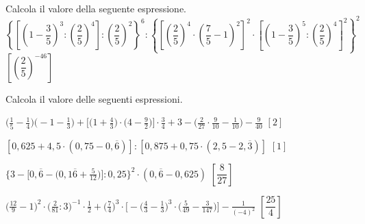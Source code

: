 
\begin{esercizio}[\Ast]
\label{ese:3.154}
Calcola il valore della seguente espressione.
\(
\left\{\left[\left(1-\dfrac{3}{5}\right)^3:\left(\dfrac{2}{5}\right)^{4}\right]:
 \left(\dfrac{2}{5}\right)^{2} \right\}^{6}
:\left\{\left[\left(\dfrac{2}{5}\right)^{4}\cdot\left(\dfrac{7}{5}-
1\right)^2\right]^{2}\cdot%
\left[\left(1-\dfrac{3}{5}\right)^{5}:\left(\dfrac{2}{5}\right)^{4}
\right]^{2}\right\}^{2}
\)
  \hfill \(\left[\left(\dfrac{2}{5} \right)^{-46} \right]\)
\end{esercizio}


\begin{esercizio}[\Ast]
\label{ese:3.155}
 Calcola il valore delle seguenti espressioni.
\begin{enumeratea}
\spazielenx
\item $\displaystyle{\bigg(\frac{1}{5}-\frac{1}{4}\bigg)\bigg(-1-
\frac{1}{3}\bigg)+\bigg[\bigg(1+\frac{4}{3}\bigg)\cdot
\bigg(4-\frac{9}{2}\bigg)\bigg]\cdot{\frac{3}{4}}+3-\bigg(\frac{2}{27}
\cdot{\frac{9}{10}}-\frac{1}{10}\bigg)-\frac{9}{40}}$
  \hfill \(\left[2 \right]\)
\item $\displaystyle{\left[0,625+4,5\cdot(0,75-0,\overline{6})\right]:
\left[0,875+0,75\cdot(2,5-2,\overline{3})\right]}$
  \hfill \(\left[1 \right]\)
\item $\displaystyle{\bigg\{3-\bigg[0,\overline{6}-\bigg(0,1\overline{6}+
\frac{5}{12}\bigg)\bigg]:0,25\bigg\}^{2}\cdot
(0,\overline{6}-0,625)}$
  \hfill \(\left[\dfrac{8}{27} \right]\)
\item $\displaystyle{\bigg(\frac{12}{9}-1\bigg)^{2}\cdot\bigg(\frac{2}{81}:3
\bigg)^{-1}\cdot\frac{1}{2}+\bigg(\frac{7}{4}\bigg)^{3}\cdot
\bigg[-\bigg(\frac{4}{3}-\frac{1}{3}\bigg)^{3}\cdot\bigg(\frac{5}{49}-
\frac{3}{147}\bigg)\bigg]-\frac{1}{(-4)^{2}}}$
  \hfill \(\left[\dfrac{25}{4} \right]\)
\end{enumeratea}
\end{esercizio}

